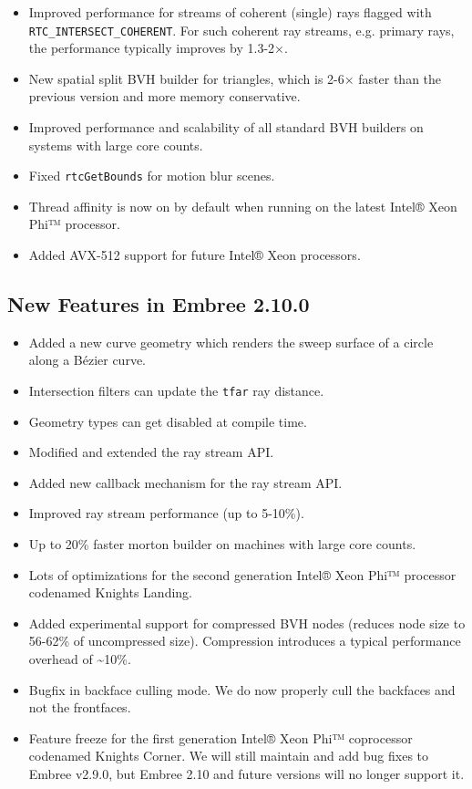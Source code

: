 \begin{itemize}
\tightlist
\item
  Improved performance for streams of coherent (single) rays flagged
  with \texttt{RTC\_INTERSECT\_COHERENT}. For such coherent ray streams,
  e.g. primary rays, the performance typically improves by 1.3-2×.
\item
  New spatial split BVH builder for triangles, which is 2-6× faster than
  the previous version and more memory conservative.
\item
  Improved performance and scalability of all standard BVH builders on
  systems with large core counts.
\item
  Fixed \texttt{rtcGetBounds} for motion blur scenes.
\item
  Thread affinity is now on by default when running on the latest Intel®
  Xeon Phi™ processor.
\item
  Added AVX-512 support for future Intel® Xeon processors.
\end{itemize}

\subsection{New Features in Embree
2.10.0}\label{new-features-in-embree-2.10.0}

\begin{itemize}
\tightlist
\item
  Added a new curve geometry which renders the sweep surface of a circle
  along a Bézier curve.
\item
  Intersection filters can update the \texttt{tfar} ray distance.
\item
  Geometry types can get disabled at compile time.
\item
  Modified and extended the ray stream API.
\item
  Added new callback mechanism for the ray stream API.
\item
  Improved ray stream performance (up to 5-10\%).
\item
  Up to 20\% faster morton builder on machines with large core counts.
\item
  Lots of optimizations for the second generation Intel® Xeon Phi™
  processor codenamed Knights Landing.
\item
  Added experimental support for compressed BVH nodes (reduces node size
  to 56-62\% of uncompressed size). Compression introduces a typical
  performance overhead of \textasciitilde10\%.
\item
  Bugfix in backface culling mode. We do now properly cull the backfaces
  and not the frontfaces.
\item
  Feature freeze for the first generation Intel® Xeon Phi™ coprocessor
  codenamed Knights Corner. We will still maintain and add bug fixes to
  Embree v2.9.0, but Embree 2.10 and future versions will no longer
  support it.
\end{itemize}

